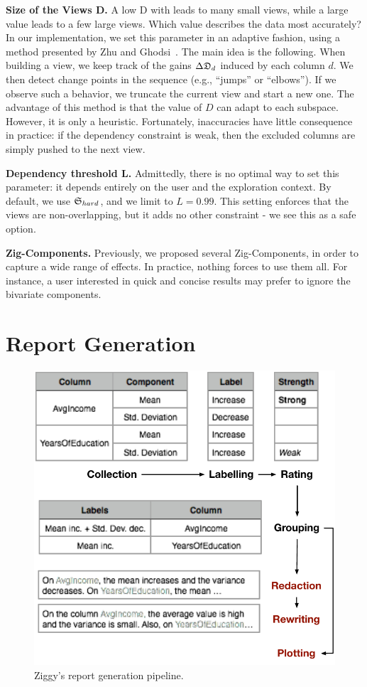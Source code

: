 \textbf{Size of the Views D.}  A low D with leads to many small views, while a
large value leads to a few large views. Which value describes the data most
accurately? In our implementation, we set this parameter in an adaptive
fashion, using a method presented by Zhu and Ghodsi~\cite{zhu2006automatic}.
The main idea is the following. When building a view, we keep track of the
gains $\Delta\mathfrak{D}_d$ induced by each column $d$.  We then detect change
points in the sequence (e.g., ``jumps'' or ``elbows'').  If we observe such a
behavior, we truncate the current view and start a new one.  The advantage of
this method is that the value of $D$ can adapt to each subspace. However, it is
only a heuristic. Fortunately, inaccuracies have little consequence in
practice: if the dependency constraint is weak, then the excluded columns are
simply pushed to the next view.

\textbf{Dependency threshold L.} Admittedly, there is no optimal way to set
this parameter: it depends entirely on the user and the exploration context. By
default, we use $\mathfrak{S}_{hard}$, and we limit to $L=0.99$. This setting
enforces that the views are non-overlapping, but it adds no other constraint -
we see this as a safe option.

\textbf{Zig-Components.} Previously, we proposed several Zig-Components, in
order to capture a wide range of effects. In practice, nothing forces to use
them all. For instance, a user interested in quick and concise results may
prefer to ignore the bivariate components.


\section{Report Generation}
\label{sec:reporting}
\begin{figure}
  \centering
  \includegraphics[width=\columnwidth]{Figures/ReportGeneration}
  \caption{Ziggy's report generation pipeline.}
  \label{pic:reportpipeline}
\end{figure}

